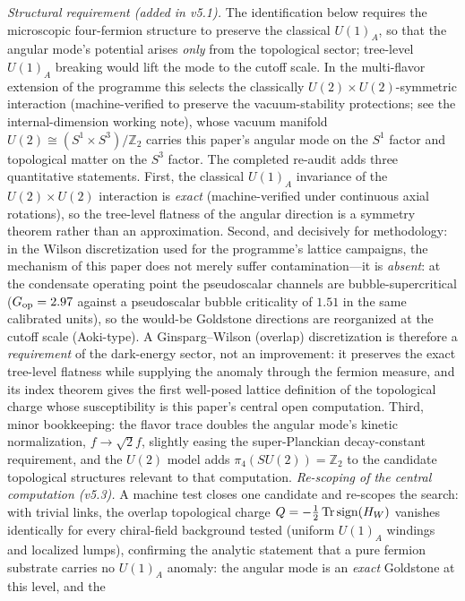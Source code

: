\documentclass[11pt]{article}
\begin{document}
\textit{Structural requirement (added in v5.1).}  The
identification below requires the microscopic four-fermion
structure to preserve the classical $U(1)_A$, so that the angular
mode's potential arises \emph{only} from the topological sector;
tree-level $U(1)_A$ breaking would lift the mode to the cutoff
scale.  In the multi-flavor extension of the programme this
selects the classically $U(2)\times U(2)$-symmetric interaction
(machine-verified to preserve the vacuum-stability protections;
see the internal-dimension working note), whose vacuum manifold
$U(2) \cong (S^1 \times S^3)/\mathbb{Z}_2$ carries this paper's
angular mode on the $S^1$ factor and topological matter on the
$S^3$ factor.
The completed re-audit adds three quantitative statements.
First, the classical $U(1)_A$ invariance of the
$U(2)\times U(2)$ interaction is \emph{exact} (machine-verified
under continuous axial rotations), so the tree-level flatness of
the angular direction is a symmetry theorem rather than an
approximation.
Second, and decisively for methodology: in the Wilson
discretization used for the programme's lattice campaigns, the
mechanism of this paper does not merely suffer contamination---it
is \emph{absent}: at the condensate operating point the
pseudoscalar channels are bubble-supercritical
($G_{\rm op} = 2.97$ against a pseudoscalar bubble criticality of
$1.51$ in the same calibrated units), so the would-be Goldstone
directions are reorganized at the cutoff scale (Aoki-type).
A Ginsparg--Wilson (overlap) discretization is therefore a
\emph{requirement} of the dark-energy sector, not an improvement:
it preserves the exact tree-level flatness while supplying the
anomaly through the fermion measure, and its index theorem gives
the first well-posed lattice definition of the topological charge
whose susceptibility is this paper's central open computation.
Third, minor bookkeeping: the flavor trace doubles the angular
mode's kinetic normalization, $f \to \sqrt{2} f$, slightly
easing the super-Planckian decay-constant requirement, and the
$U(2)$ model adds $\pi_4(SU(2)) = \mathbb{Z}_2$ to the candidate
topological structures relevant to that computation.
\textit{Re-scoping of the central computation (v5.3).}
A machine test closes one candidate and re-scopes the search: with
trivial links, the overlap topological charge
$Q = -\tfrac12\,{\rm Tr}\,{\rm sign}(H_W)$ vanishes identically
for every chiral-field background tested (uniform $U(1)_A$
windings and localized lumps), confirming the analytic statement
that a pure fermion substrate carries no $U(1)_A$ anomaly: the
angular mode is an \emph{exact} Goldstone at this level, and the
\end{document}
